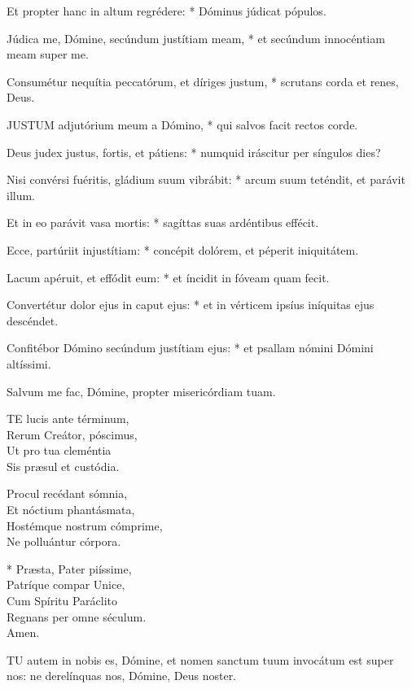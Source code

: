Et propter hanc in altum regrédere: * Dóminus júdicat pópulos.

Júdica me, Dómine, secúndum justítiam meam, * et secúndum innocéntiam meam super me.

Consumétur nequítia peccatórum, et díriges justum, * scrutans corda et renes, Deus.


\lettrine[lines=2]{J}{USTUM} adjutórium meum a Dómino, * qui salvos facit rectos corde.

Deus judex justus, fortis, et pátiens: * numquid iráscitur per síngulos dies?

Nisi convérsi fuéritis, gládium suum vibrábit: * arcum suum teténdit, et parávit illum.

Et in eo parávit vasa mortis: * sagíttas suas ardéntibus effécit.

Ecce, partúriit injustítiam: * concépit dolórem, et péperit iniquitátem.

Lacum apéruit, et effódit eum: * et íncidit in fóveam quam fecit.

Convertétur dolor ejus in caput ejus: * et in vérticem ipsíus iníquitas ejus descéndet.

Confitébor Dómino secúndum justítiam ejus: * et psallam nómini Dómini altíssimi.

 Salvum me fac, Dómine, propter misericórdiam tuam.


\lettrine[lines=2]{T}{E} lucis ante términum,\\
Rerum Creátor, póscimus,\\
Ut pro tua cleméntia\\
Sis præsul et custódia.

Procul recédant sómnia,\\
Et nóctium phantásmata,\\
Hostémque nostrum cómprime,\\
Ne polluántur córpora.

* Præsta, Pater piíssime,\\
Patríque compar Unice,\\
Cum Spíritu Paráclito\\
Regnans per omne séculum.\\
Amen.


\lettrine[lines=2]{T}{U} autem in nobis es, Dómine, et nomen sanctum tuum invocátum est super nos: ne derelínquas nos, Dómine, Deus noster.

